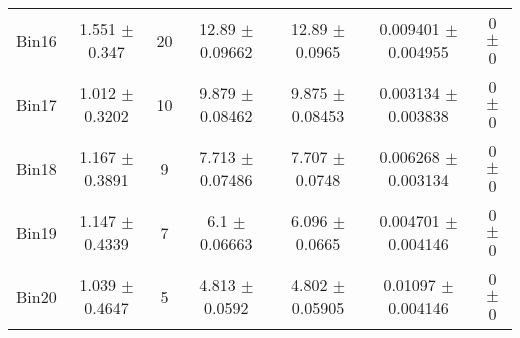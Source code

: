 \begin{tabular}{@{\extracolsep{4pt}}lcccccc@{}}
     Bin16 & 1.551 $\pm$ 0.347 & 20 & 12.89 $\pm$ 0.09662 & 12.89 $\pm$ 0.0965 & 0.009401 $\pm$ 0.004955 & 0 $\pm$ 0 \\ 
     Bin17 & 1.012 $\pm$ 0.3202 & 10 & 9.879 $\pm$ 0.08462 & 9.875 $\pm$ 0.08453 & 0.003134 $\pm$ 0.003838 & 0 $\pm$ 0 \\ 
     Bin18 & 1.167 $\pm$ 0.3891 & 9 & 7.713 $\pm$ 0.07486 & 7.707 $\pm$ 0.0748 & 0.006268 $\pm$ 0.003134 & 0 $\pm$ 0 \\ 
     Bin19 & 1.147 $\pm$ 0.4339 & 7 & 6.1 $\pm$ 0.06663 & 6.096 $\pm$ 0.0665 & 0.004701 $\pm$ 0.004146 & 0 $\pm$ 0 \\ 
     Bin20 & 1.039 $\pm$ 0.4647 & 5 & 4.813 $\pm$ 0.0592 & 4.802 $\pm$ 0.05905 & 0.01097 $\pm$ 0.004146 & 0 $\pm$ 0 \\ 
\hline\hline
  \end{tabular}
